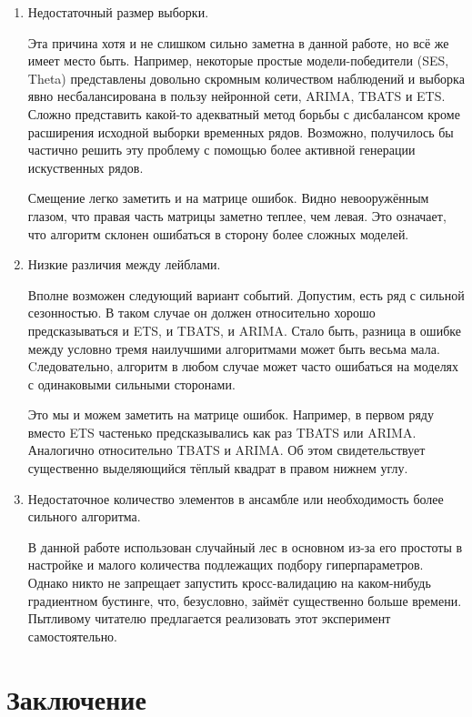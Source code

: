 \documentclass[a4paper,12pt]{article}
\begin{document}
\begin{enumerate}
	\item Недостаточный размер выборки. 
	
	Эта причина хотя и не слишком сильно заметна в данной работе, но всё же имеет место быть. Например, некоторые простые модели-победители (SES, Theta) представлены довольно скромным количеством наблюдений и выборка явно несбалансирована в пользу нейронной сети, ARIMA, TBATS и ETS. Сложно представить какой-то адекватный метод борьбы с дисбалансом кроме расширения исходной выборки временных рядов. Возможно, получилось бы частично решить эту проблему с помощью более активной генерации искуственных рядов.
	
	Смещение легко заметить и на матрице ошибок. Видно невооружённым глазом, что правая часть матрицы заметно теплее, чем левая. Это означает, что алгоритм склонен ошибаться в сторону более сложных моделей.
	
	
	\item Низкие различия между лейблами.
	
	Вполне возможен следующий вариант событий. Допустим, есть ряд с сильной сезонностью. В таком случае он должен относительно хорошо предсказываться и ETS, и TBATS, и ARIMA. Стало быть, разница в ошибке между условно тремя наилучшими алгоритмами может быть весьма мала. Cледовательно, алгоритм в любом случае может часто ошибаться на моделях с одинаковыми сильными сторонами.
	
	Это мы и можем заметить на матрице ошибок. Например, в первом ряду вместо ETS частенько предсказывались как раз TBATS или ARIMA. Аналогично относительно TBATS и ARIMA. Об этом свидетельствует существенно выделяющийся тёплый квадрат в правом нижнем углу. 
	
	\item Недостаточное количество элементов в ансамбле или необходимость более сильного алгоритма. 
	
	В данной работе использован случайный лес в основном из-за его простоты в настройке и малого количества подлежащих подбору гиперпараметров. Однако никто  не запрещает запустить кросс-валидацию на каком-нибудь градиентном бустинге, что, безусловно, займёт существенно больше времени. Пытливому читателю предлагается реализовать этот эксперимент самостоятельно.
	
\end{enumerate}

\newpage
\section{Заключение}
\end{document}
